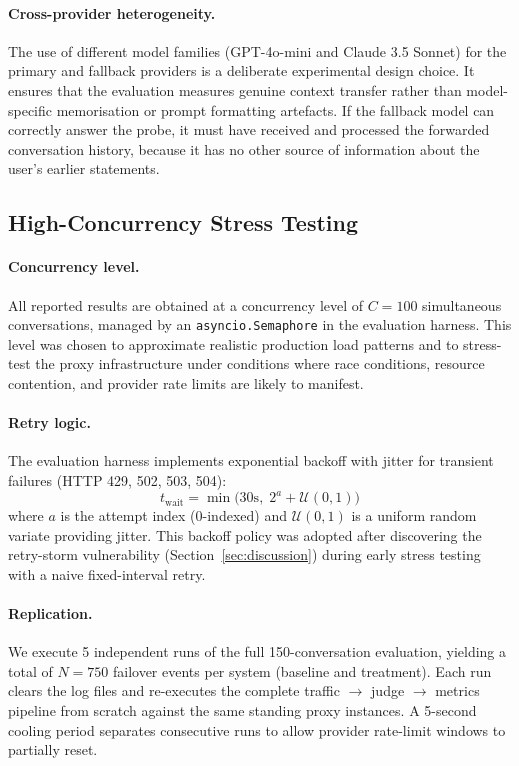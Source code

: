 \paragraph{Cross-provider heterogeneity.}
The use of different model families (GPT-4o-mini and Claude 3.5 Sonnet) for the primary and fallback providers is a deliberate experimental design choice. It ensures that the evaluation measures genuine context transfer rather than model-specific memorisation or prompt formatting artefacts. If the fallback model can correctly answer the probe, it must have received and processed the forwarded conversation history, because it has no other source of information about the user's earlier statements.

\subsection{High-Concurrency Stress Testing}
\label{sec:stress}

\paragraph{Concurrency level.}
All reported results are obtained at a concurrency level of $C = 100$ simultaneous conversations, managed by an \texttt{asyncio.Semaphore} in the evaluation harness. This level was chosen to approximate realistic production load patterns and to stress-test the proxy infrastructure under conditions where race conditions, resource contention, and provider rate limits are likely to manifest.

\paragraph{Retry logic.}
The evaluation harness implements exponential backoff with jitter for transient failures (HTTP 429, 502, 503, 504):
\[
    t_{\text{wait}} = \min\!\big(30\text{s},\; 2^{a} + \mathcal{U}(0, 1)\big)
\]
where $a$ is the attempt index (0-indexed) and $\mathcal{U}(0,1)$ is a uniform random variate providing jitter. This backoff policy was adopted after discovering the retry-storm vulnerability (Section~\ref{sec:discussion}) during early stress testing with a naive fixed-interval retry.

\paragraph{Replication.}
We execute 5 independent runs of the full 150-conversation evaluation, yielding a total of $N = 750$ failover events per system (baseline and treatment). Each run clears the log files and re-executes the complete traffic $\rightarrow$ judge $\rightarrow$ metrics pipeline from scratch against the same standing proxy instances. A 5-second cooling period separates consecutive runs to allow provider rate-limit windows to partially reset.


